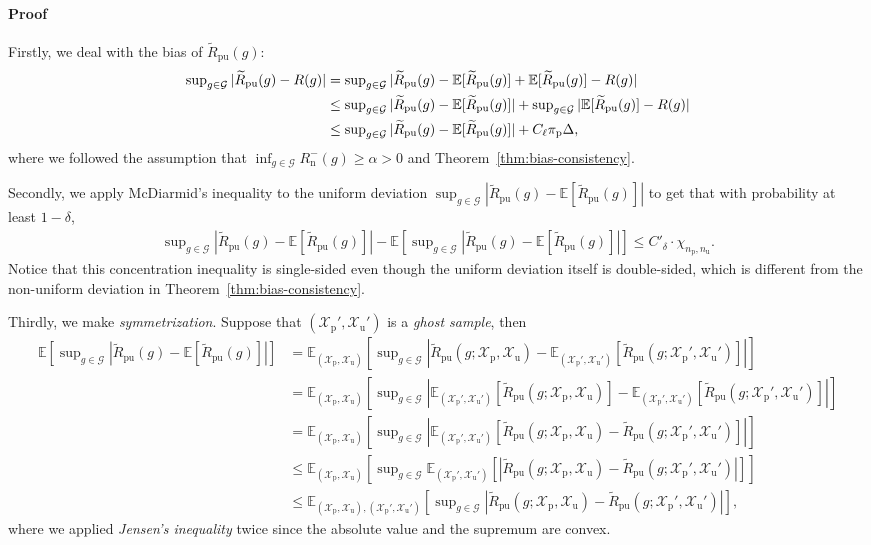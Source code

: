 \documentclass[12pt]{article}
\newcommand{\bE}{\mathbb{E}}
\newcommand{\cG}{\mathcal{G}}
\newcommand{\cX}{\mathcal{X}}
\newcommand{\pip}{\pi_\mathrm{p}}
\newcommand{\Xp}{\cX_\mathrm{p}}
\newcommand{\Xu}{\cX_\mathrm{u}}
\newcommand{\Np}{{n_\mathrm{p}}}
\newcommand{\Nu}{{n_\mathrm{u}}}
\newcommand{\Rn}{R_\mathrm{n}}
\newcommand{\tRpu}{\widetilde{R}_\mathrm{pu}}
\theoremstyle{definition}
\begin{document}
\paragraph{Proof}%
Firstly, we deal with the bias of $\tRpu(g)$:
\begin{align}
\sup\nolimits_{g\in\cG}|\tRpu(g)-R(g)|
&= \sup\nolimits_{g\in\cG}|\tRpu(g)-\bE[\tRpu(g)]
+\bE[\tRpu(g)]-R(g)| \\
&\le \sup\nolimits_{g\in\cG}|\tRpu(g)-\bE[\tRpu(g)]|
+\sup\nolimits_{g\in\cG}|\bE[\tRpu(g)]-R(g)| \notag\\
\label{eq:uni-dev-bias}%
&\le \sup\nolimits_{g\in\cG}|\tRpu(g)-\bE[\tRpu(g)]|
+C_\ell\pip\Delta,
\end{align}
where we followed the assumption that $\inf_{g\in\cG}\Rn^-(g)\ge\alpha>0$ and Theorem~\eqref{thm:bias-consistency}.

Secondly, we apply McDiarmid's inequality to the uniform deviation $\sup\nolimits_{g\in\cG}|\tRpu(g)-\bE[\tRpu(g)]|$ to get that with probability at least $1-\delta$,
\begin{align}
\label{eq:uni-dev-martingale}%
\sup\nolimits_{g\in\cG}|\tRpu(g)-\bE[\tRpu(g)]|
-\bE[\sup\nolimits_{g\in\cG}|\tRpu(g)-\bE[\tRpu(g)]|]
\le C'_\delta\cdot\chi_{\Np,\Nu}.
\end{align}
Notice that this concentration inequality is single-sided even though the uniform deviation itself is double-sided, which is different from the non-uniform deviation in Theorem~\ref{thm:bias-consistency}.

Thirdly, we make \emph{symmetrization}. Suppose that $(\Xp',\Xu')$ is a \emph{ghost sample}, then
\begin{align*}
\bE[\sup\nolimits_{g\in\cG}|\tRpu(g)-\bE[\tRpu(g)]|]
&= \bE_{(\Xp,\Xu)}[\sup\nolimits_{g\in\cG}|\tRpu(g;\Xp,\Xu)-\bE_{(\Xp',\Xu')}[\tRpu(g;\Xp',\Xu')]|]\\
&= \bE_{(\Xp,\Xu)}[\sup\nolimits_{g\in\cG}|\bE_{(\Xp',\Xu')}[\tRpu(g;\Xp,\Xu)]-\bE_{(\Xp',\Xu')}[\tRpu(g;\Xp',\Xu')]|]\\
&= \bE_{(\Xp,\Xu)}[\sup\nolimits_{g\in\cG}|\bE_{(\Xp',\Xu')}[\tRpu(g;\Xp,\Xu)-\tRpu(g;\Xp',\Xu')]|]\\
&\le \bE_{(\Xp,\Xu)}[\sup\nolimits_{g\in\cG}\bE_{(\Xp',\Xu')}[|\tRpu(g;\Xp,\Xu)-\tRpu(g;\Xp',\Xu')|]]\\
&\le \bE_{(\Xp,\Xu),(\Xp',\Xu')}[\sup\nolimits_{g\in\cG}|\tRpu(g;\Xp,\Xu)-\tRpu(g;\Xp',\Xu')|],
\end{align*}
where we applied \emph{Jensen's inequality} twice since the absolute value and the supremum are convex. 
\end{document}
